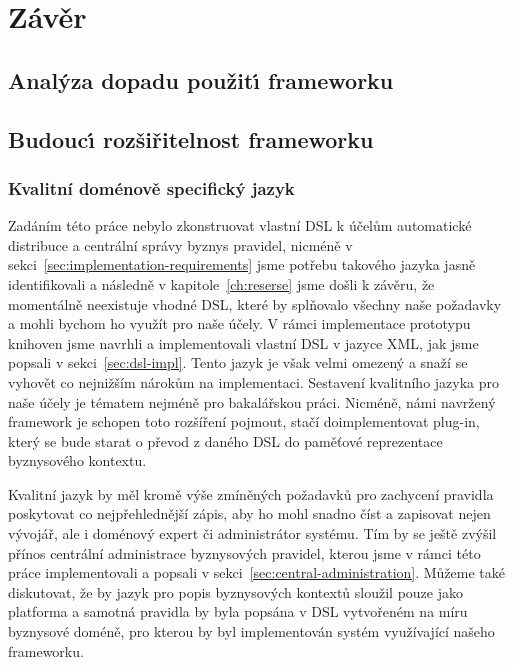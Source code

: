 

\chapter{Závěr}\label{ch:zaver}

\section{Anal\'yza dopadu použit\'{\i} frameworku}

\section{Budouc\'{\i} rozšiřitelnost frameworku}

\subsection{Kvalitní doménově specifický jazyk}
Zadáním této práce nebylo zkonstruovat vlastní \gls{DSL}
k účelům automatické distribuce a centrální správy byznys pravidel,
nicméně v sekci~\ref{sec:implementation-requirements} jsme potřebu takového
jazyka jasně identifikovali a následně v kapitole~\ref{ch:reserse}
jsme došli k závěru, že momentálně neexistuje vhodné \gls{DSL},
které by splňovalo všechny naše požadavky a mohli bychom ho
využít pro naše účely. V rámci implementace prototypu knihoven
jsme navrhli a implementovali vlastní \gls{DSL} v jazyce \gls{XML},
jak jsme popsali v sekci~\ref{sec:dsl-impl}. Tento jazyk je však
velmi omezený a snaží se vyhovět co nejnižším nárokům na implementaci.
Sestavení kvalitního jazyka pro naše účely je tématem nejméně pro
bakalářskou práci. Nicméně, námi navržený framework je schopen toto
rozšíření pojmout, stačí doimplementovat plug-in, který se bude starat
o převod z daného \gls{DSL} do paměťové reprezentace byznysového kontextu.

Kvalitní jazyk by měl kromě výše zmíněných požadavků pro zachycení
pravidla poskytovat co nejpřehlednější zápis, aby ho mohl snadno číst a zapisovat
nejen vývojář, ale i doménový expert či administrátor systému. Tím by se
ještě zvýšil přínos centrální administrace byznysových pravidel, kterou jsme v rámci
této práce implementovali a popsali v sekci~\ref{sec:central-administration}.
Můžeme také diskutovat, že by jazyk pro popis byznysových kontextů sloužil pouze
jako platforma a samotná pravidla by byla popsána v \gls{DSL} vytvořeném na míru
byznysové doméně, pro kterou by byl implementován systém využívající našeho frameworku.

